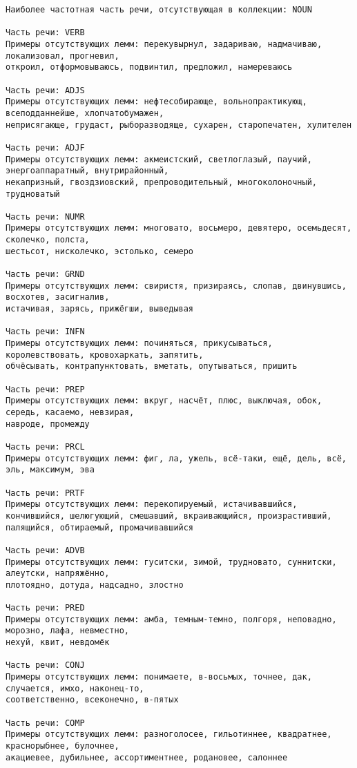 \documentclass[11pt]{article}
\begin{document}
    \begin{Verbatim}[commandchars=\\\{\}]
Наиболее частотная часть речи, отсутствующая в коллекции: NOUN

Часть речи: VERB
Примеры отсутствующих лемм: перекувырнул, задариваю, надмачиваю, локализовал, прогневил,
откроил, отформовываюсь, подвинтил, предложил, намереваюсь

Часть речи: ADJS
Примеры отсутствующих лемм: нефтесобирающе, вольнопрактикующ, всеподданнейше, хлопчатобумажен,
неприсягающе, грудаст, рыборазводяще, сухарен, старопечатен, хулителен

Часть речи: ADJF
Примеры отсутствующих лемм: акмеистский, светлоглазый, паучий, энергоаппаратный, внутрирайонный,
некапризный, гвоздзиовский, препроводительный, многоколоночный, трудноватый

Часть речи: NUMR
Примеры отсутствующих лемм: многовато, восьмеро, девятеро, осемьдесят, сколечко, полста,
шестьсот, нисколечко, эстолько, семеро

Часть речи: GRND
Примеры отсутствующих лемм: свиристя, призираясь, слопав, двинувшись, восхотев, засигналив,
истачивая, зарясь, прижёгши, выведывая

Часть речи: INFN
Примеры отсутствующих лемм: починяться, прикусываться, королевствовать, кровохаркать, запятить,
обчёсывать, контрапунктовать, вметать, опутываться, пришить

Часть речи: PREP
Примеры отсутствующих лемм: вкруг, насчёт, плюс, выключая, обок, середь, касаемо, невзирая,
навроде, промежду

Часть речи: PRCL
Примеры отсутствующих лемм: фиг, ла, ужель, всё-таки, ещё, дель, всё, эль, максимум, эва

Часть речи: PRTF
Примеры отсутствующих лемм: перекопируемый, истачивавшийся, кончившийся, шелюгующий, смешавший, вкраивающийся, произрастивший, палящийся, обтираемый, промачивавшийся

Часть речи: ADVB
Примеры отсутствующих лемм: гуситски, зимой, трудновато, суннитски, алеутски, напряжённо,
плотоядно, дотуда, надсадно, злостно

Часть речи: PRED
Примеры отсутствующих лемм: амба, темным-темно, полгоря, неповадно, морозно, лафа, невместно,
нехуй, квит, невдомёк

Часть речи: CONJ
Примеры отсутствующих лемм: понимаете, в-восьмых, точнее, дак, случается, имхо, наконец-то,
соответственно, всеконечно, в-пятых

Часть речи: COMP
Примеры отсутствующих лемм: разноголосее, гильотиннее, квадратнее, краснорыбнее, булочнее,
акациевее, дубильнее, ассортиментнее, родановее, салоннее


\end{Verbatim}
\end{document}
